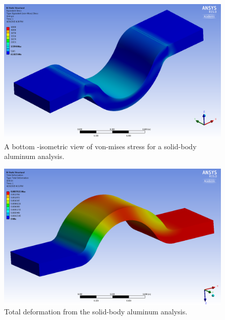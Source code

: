 \begin{figure}[htp]
\centering
\includegraphics[width=1\textwidth]{./figures/fea/fea-solid-al-vms-bottom}
\caption{A bottom -isometric view of von-mises stress for a solid-body aluminum analysis.}
\label{fig:fea-solid-al-vms-bottom}
\end{figure}


\begin{figure}[htp]
\centering
\includegraphics[width=1\textwidth]{./figures/fea/fea-solid-al-def-tot}
\caption{Total deformation from the solid-body aluminum analysis.}
\label{fig:fea-solid-al-def-tot}
\end{figure}


